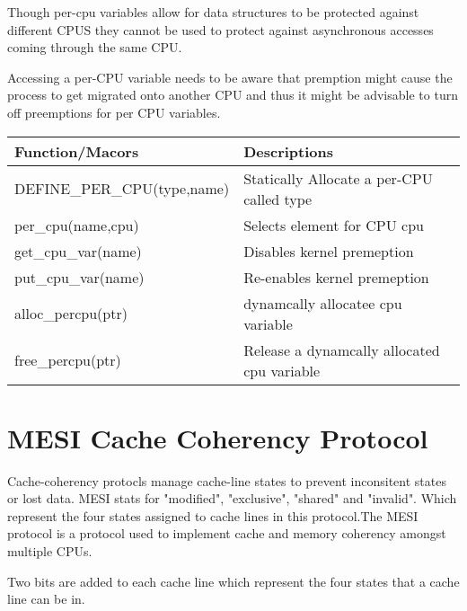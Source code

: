 \documentclass{article}
\begin{document}
Though per-cpu variables allow for data structures to be protected
against different CPUS they cannot be used to protect against
asynchronous accesses coming through the same CPU.

Accessing a per-CPU variable needs to be aware that premption might
cause the process to get migrated onto another CPU and thus it might
be advisable to turn off preemptions for per CPU variables.


\begin{center}
  \begin{tabular}{ l | l }
    
    \hline
    Function/Macors & Descriptions \\ \hline
    DEFINE\_PER\_CPU(type,name) & Statically Allocate a per-CPU called type \\ 
    per\_cpu(name,cpu) & Selects element for CPU cpu \\ 
    get\_cpu\_var(name) &  Disables kernel premeption \\
    put\_cpu\_var(name) &  Re-enables kernel premeption \\
    alloc\_percpu(ptr) &  dynamcally allocatee cpu variable \\
    free\_percpu(ptr) &  Release a dynamcally allocated cpu variable \\
    \hline
  \end{tabular}
\end{center}

\section{MESI Cache Coherency Protocol}

Cache-coherency protocls manage cache-line states to prevent
inconsitent states or lost data. MESI stats for "modified",
"exclusive", "shared" and "invalid". Which represent the four states
assigned to cache lines in this protocol.The MESI protocol is a
protocol used to implement cache and memory coherency amongst multiple
CPUs. \cite{Birdetal2001}

Two bits are added to each cache line which represent the four states
that a cache line can be in.
\end{document}

